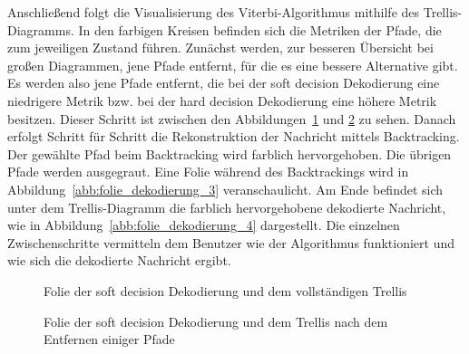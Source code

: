 Anschließend folgt die Visualisierung des Viterbi-Algorithmus mithilfe des Trellis-Diagramms. In den farbigen Kreisen befinden sich die Metriken der Pfade, die zum jeweiligen Zustand führen. Zunächst werden, zur besseren Übersicht bei großen Diagrammen, jene Pfade entfernt, für die es eine bessere Alternative gibt. Es werden also jene Pfade entfernt, die bei der soft decision Dekodierung eine niedrigere Metrik bzw. bei der hard decision Dekodierung eine höhere Metrik besitzen. Dieser Schritt ist zwischen den Abbildungen~\ref{abb:folie_dekodierung_1} und \ref{abb:folie_dekodierung_2} zu sehen. Danach erfolgt Schritt für Schritt die Rekonstruktion der Nachricht mittels Backtracking. Der gewählte Pfad beim Backtracking wird farblich hervorgehoben. Die übrigen Pfade werden ausgegraut. Eine Folie während des Backtrackings wird in Abbildung~\ref{abb:folie_dekodierung_3} veranschaulicht. Am Ende befindet sich unter dem Trellis-Diagramm die farblich hervorgehobene dekodierte Nachricht, wie in Abbildung~\ref{abb:folie_dekodierung_4} dargestellt. Die einzelnen Zwischenschritte vermitteln dem Benutzer wie der Algorithmus funktioniert und wie sich die dekodierte Nachricht ergibt.
\begin{figure}[th]
	\centering
	\caption{Folie der soft decision Dekodierung und dem vollständigen Trellis}
	\label{abb:folie_dekodierung_1}
\end{figure}
\begin{figure}[th]
	\centering
	\caption{Folie der soft decision Dekodierung und dem Trellis nach dem Entfernen einiger Pfade}
	\label{abb:folie_dekodierung_2}
\end{figure}
